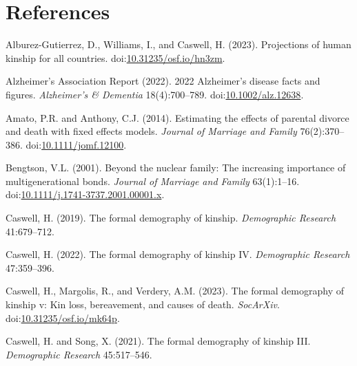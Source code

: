 \documentclass[
  11pt,
  letterpaper,
]{article}
\newlength{\cslhangindent}
\newlength{\cslentryspacingunit} %
\newenvironment{CSLReferences}[2] %
 {%
  \setlength{\parindent}{0pt}
  \ifodd #1
  \let\oldpar\par
  \def\par{\hangindent=\cslhangindent\oldpar}
  \fi
  \setlength{\parskip}{#2\cslentryspacingunit}
 }%
 {}
\begin{document}
\hypertarget{references}{%
\section*{References}\label{references}}

\hypertarget{refs}{}
\begin{CSLReferences}{1}{0}
\leavevmode{}%
Alburez-Gutierrez, D., Williams, I., and Caswell, H. (2023). Projections of human kinship for all countries. doi:\href{https://doi.org/10.31235/osf.io/hn3zm}{10.31235/osf.io/hn3zm}.

\leavevmode{}%
Alzheimer's Association Report (2022). 2022 {A}lzheimer's disease facts and figures. \emph{{A}lzheimer's \& Dementia} 18(4):700--789. doi:\href{https://doi.org/10.1002/alz.12638}{10.1002/alz.12638}.

\leavevmode{}%
Amato, P.R. and Anthony, C.J. (2014). Estimating the effects of parental divorce and death with fixed effects models. \emph{Journal of Marriage and Family} 76(2):370--386. doi:\href{https://doi.org/10.1111/jomf.12100}{10.1111/jomf.12100}.

\leavevmode{}%
Bengtson, V.L. (2001). Beyond the nuclear family: The increasing importance of multigenerational bonds. \emph{Journal of Marriage and Family} 63(1):1--16. doi:\href{https://doi.org/10.1111/j.1741-3737.2001.00001.x}{10.1111/j.1741-3737.2001.00001.x}.

\leavevmode{}%
Caswell, H. (2019). The formal demography of kinship. \emph{Demographic Research} 41:679--712.

\leavevmode{}%
Caswell, H. (2022). The formal demography of kinship IV. \emph{Demographic Research} 47:359--396.

\leavevmode{}%
Caswell, H., Margolis, R., and Verdery, A.M. (2023). The formal demography of kinship v: Kin loss, bereavement, and causes of death. \emph{SocArXiv}. doi:\href{https://doi.org/10.31235/osf.io/mk64p}{10.31235/osf.io/mk64p}.

\leavevmode{}%
Caswell, H. and Song, X. (2021). The formal demography of kinship III. \emph{Demographic Research} 45:517--546.


\end{CSLReferences}
\end{document}

